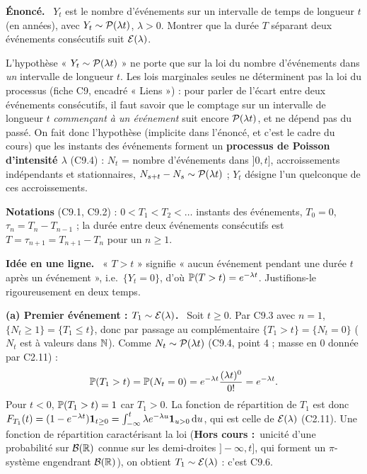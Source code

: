 \documentclass[11pt,a4paper]{article}
\newcommand{\question}[1]{\par\medskip\noindent\textbf{#1}~}
\newcommand{\HC}{\textbf{Hors cours :}~}
\begin{document}
\begin{exo}

\question{Énoncé.} $Y_t$ est le nombre d'événements sur un intervalle de temps de longueur $t$ (en années), avec $Y_t\sim\mathcal{P}(\lambda t)$,
$\lambda>0$. Montrer que la durée $T$ séparant deux événements consécutifs suit $\mathcal{E}(\lambda)$.

\begin{alerte}
L'hypothèse « $Y_t\sim\mathcal{P}(\lambda t)$ » ne porte que sur la loi du nombre d'événements dans \emph{un} intervalle de longueur $t$. Les lois
marginales seules ne déterminent pas la loi du processus (fiche C9, encadré « Liens ») : pour parler de l'écart entre deux événements
consécutifs, il faut savoir que le comptage sur un intervalle de longueur $t$ \emph{commençant à un événement} suit encore
$\mathcal{P}(\lambda t)$, et ne dépend pas du passé. On fait donc l'hypothèse (implicite dans l'énoncé, et c'est le cadre du cours) que les
instants des événements forment un \textbf{processus de Poisson d'intensité $\lambda$} (C9.4) : $N_t$ = nombre d'événements dans $]0,t]$,
accroissements indépendants et stationnaires, $N_{s+t}-N_s\sim\mathcal{P}(\lambda t)$ ; $Y_t$ désigne l'un quelconque de ces accroissements.
\end{alerte}

\textbf{Notations} (C9.1, C9.2) : $0<T_1<T_2<\dots$ instants des événements, $T_0=0$, $\tau_n=T_n-T_{n-1}$ ; la durée entre deux
événements consécutifs est $T=\tau_{n+1}=T_{n+1}-T_n$ pour un $n\ge1$.

\question{Idée en une ligne.} « $T>t$ » signifie « aucun événement pendant une durée $t$ après un événement », i.e.\ $\{Y_t=0\}$, d'où
$\mathbb{P}(T>t)=e^{-\lambda t}$. Justifions-le rigoureusement en deux temps.

\question{(a) Premier événement : $T_1\sim\mathcal{E}(\lambda)$.}
Soit $t\ge0$. Par C9.3 avec $n=1$, $\{N_t\ge1\}=\{T_1\le t\}$, donc par passage au complémentaire $\{T_1>t\}=\{N_t=0\}$ ($N_t$ est à valeurs
dans $\mathbb{N}$). Comme $N_t\sim\mathcal{P}(\lambda t)$ (C9.4, point 4 ; masse en $0$ donnée par C2.11) :
\[\mathbb{P}(T_1>t)=\mathbb{P}(N_t=0)=e^{-\lambda t}\frac{(\lambda t)^0}{0!}=e^{-\lambda t}.\]
Pour $t<0$, $\mathbb{P}(T_1>t)=1$ car $T_1>0$. La fonction de répartition de $T_1$ est donc
$F_{T_1}(t)=(1-e^{-\lambda t})\mathbf{1}_{t\ge0}=\int_{-\infty}^t\lambda e^{-\lambda u}\mathbf{1}_{u>0}\,\mathrm{d} u$, qui est celle de $\mathcal{E}(\lambda)$ (C2.11).
Une fonction de répartition caractérisant la loi (\HC unicité d'une probabilité sur $\mathcal{B}(\mathbb{R})$ connue sur les demi-droites
$]-\infty,t]$, qui forment un $\pi$-système engendrant $\mathcal{B}(\mathbb{R})$), on obtient $T_1\sim\mathcal{E}(\lambda)$ : c'est C9.6.


\end{exo}
\end{document}
